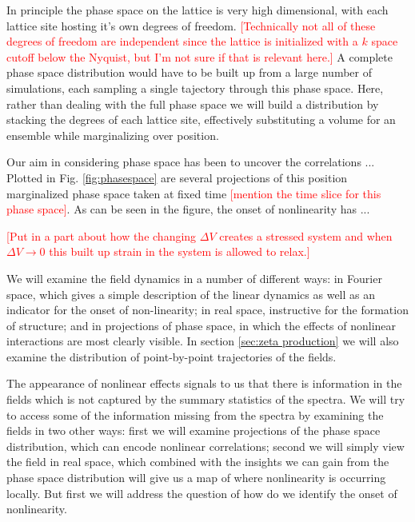 
In principle the phase space on the lattice is very high dimensional, with each lattice site hosting it's own degrees of freedom. \textcolor{red}{[Technically not all of these degrees of freedom are independent since the lattice is initialized with a $k$ space cutoff below the Nyquist, but I'm not sure if that is relevant here.]} A complete phase space distribution would have to be built up from a large number of simulations, each sampling a single tajectory through this phase space. Here, rather than dealing with the full phase space we will build a distribution by stacking the degrees of each lattice site, effectively substituting a volume for an ensemble while marginalizing over position.

Our aim in considering phase space has been to uncover the correlations ...  Plotted in Fig. \ref{fig:phasespace} are several projections of this position marginalized phase space taken at fixed time \textcolor{red}{[mention the time slice for this phase space]}. As can be seen in the figure, the onset of nonlinearity has ...

\textcolor{red}{[Put in a part about how the changing $\Delta V$ creates a stressed system and when $\Delta V \to 0$ this built up strain in the system is allowed to relax.]}

\Fphasespace




\Ftraj

We will examine the field dynamics in a number of different ways:
in Fourier space, which gives a simple description of the linear dynamics as well as an indicator for the onset of non-linearity;
in real space, instructive for the formation of structure;
and in projections of phase space, in which the effects of nonlinear interactions are most clearly visible. 
In section \ref{sec:zeta production} we will also examine the distribution of point-by-point trajectories of the fields.

The appearance of nonlinear effects signals to us that there is information in the fields which is not captured by the summary statistics of the spectra.
We will try to access some of the information missing from the spectra by examining the fields in two other ways: first we will examine projections of the phase space distribution, which can encode nonlinear correlations; second we will simply view the field in real space, which combined with the insights we can gain from the phase space distribution will give us a map of where nonlinearity is occurring locally.
But first we will address the question of how do we identify the onset of nonlinearity.

